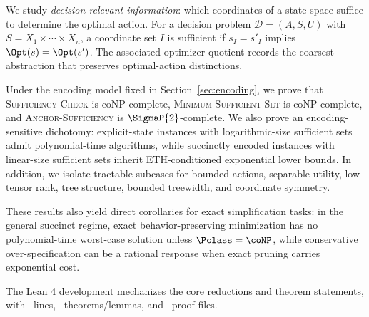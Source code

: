 We study \emph{decision-relevant information}: which coordinates of a state space suffice to determine the optimal action. For a decision problem $\mathcal{D}=(A,S,U)$ with $S=X_1 \times \cdots \times X_n$, a coordinate set $I$ is sufficient if $s_I=s'_I$ implies $\Opt(s)=\Opt(s')$. The associated optimizer quotient records the coarsest abstraction that preserves optimal-action distinctions.

Under the encoding model fixed in Section~\ref{sec:encoding}, we prove that \textsc{Sufficiency-Check} is coNP-complete, \textsc{Minimum-Sufficient-Set} is coNP-complete, and \textsc{Anchor-Sufficiency} is $\SigmaP{2}$-complete. We also prove an encoding-sensitive dichotomy: explicit-state instances with logarithmic-size sufficient sets admit polynomial-time algorithms, while succinctly encoded instances with linear-size sufficient sets inherit ETH-conditioned exponential lower bounds. In addition, we isolate tractable subcases for bounded actions, separable utility, low tensor rank, tree structure, bounded treewidth, and coordinate symmetry.

These results also yield direct corollaries for exact simplification tasks: in the general succinct regime, exact behavior-preserving minimization has no polynomial-time worst-case solution unless $\Pclass=\coNP$, while conservative over-specification can be a rational response when exact pruning carries exponential cost.

The Lean 4 development mechanizes the core reductions and theorem statements, with \LeanTotalLines\ lines, \LeanTotalTheorems\ theorems/lemmas, and \LeanTotalFiles\ proof files.
